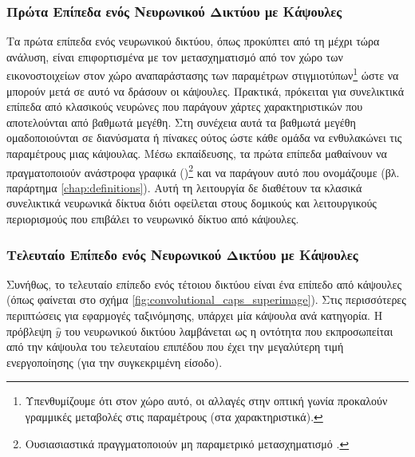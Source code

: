 \subsubsection{Πρώτα Επίπεδα ενός Νευρωνικού Δικτύου με Κάψουλες}
Τα πρώτα επίπεδα ενός νευρωνικού δικτύου, όπως προκύπτει από τη μέχρι τώρα ανάλυση, είναι επιφορτισμένα με τον μετασχηματισμό από τον χώρο των εικονοστοιχείων στον χώρο αναπαράστασης των παραμέτρων στιγμιοτύπων\footnote{Υπενθυμίζουμε ότι στον χώρο αυτό, οι αλλαγές στην οπτική γωνία προκαλούν γραμμικές μεταβολές στις παραμέτρους (στα χαρακτηριστικά).} ώστε να μπορούν μετά σε αυτό να δράσουν οι κάψουλες. Πρακτικά, πρόκειται για συνελικτικά επίπεδα από κλασικούς νευρώνες που παράγουν χάρτες χαρακτηριστικών που αποτελούνται από βαθμωτά μεγέθη. Στη συνέχεια αυτά τα βαθμωτά μεγέθη ομαδοποιούνται σε διανύσματα ή πίνακες ούτος ώστε κάθε ομάδα να ενθυλακώνει τις παραμέτρους μιας κάψουλας. Μέσω εκπαίδευσης, τα πρώτα επίπεδα μαθαίνουν να πραγματοποιούν ανάστροφα γραφικά ()\footnote{Ουσιασιαστικά πραγγματοποιούν μη παραμετρικό μετασχηματισμό .} και να παράγουν αυτό που ονομάζουμε  (βλ. παράρτημα \ref{chap:definitions}). Αυτή τη λειτουργία δε διαθέτουν τα κλασικά συνελικτικά νευρωνικά δίκτυα διότι οφείλεται στους δομικούς και λειτουργικούς περιορισμούς που επιβάλει το νευρωνικό δίκτυο από κάψουλες.\par

\subsubsection{Τελευταίο Επίπεδο ενός Νευρωνικού Δικτύου με Κάψουλες}
Συνήθως, το τελευταίο επίπεδο ενός τέτοιου δικτύου είναι ένα επίπεδο από κάψουλες (όπως φαίνεται στο σχήμα \ref{fig:convolutional_caps_superimage}). Στις περισσότερες περιπτώσεις για εφαρμογές ταξινόμησης, υπάρχει μία κάψουλα ανά κατηγορία. Η πρόβλεψη $\hat{y}$ του νευρωνικού δικτύου λαμβάνεται ως η οντότητα που εκπροσωπείται από την κάψουλα του τελευταίου επιπέδου που έχει την μεγαλύτερη τιμή ενεργοποίησης (για την συγκεκριμένη είσοδο).

